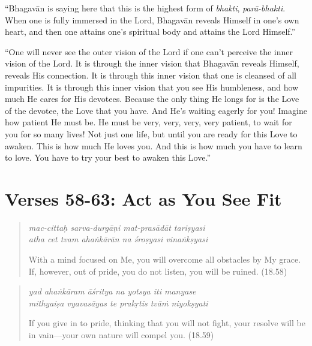 \documentclass[12pt, twoside, openright]{memoir}
\begin{document}
\enquote{Bhagavān is saying here that this is the highest form of \textit{bhakti}, \textit{parā-bhakti}. When one is fully immersed in the Lord, Bhagavān reveals Himself in one’s own heart, and then one attains one’s spiritual body and attains the Lord Himself.}

\enquote{One will never see the outer vision of the Lord if one can’t perceive the inner vision of the Lord. It is through the inner vision that Bhagavān reveals Himself, reveals His connection. It is through this inner vision that one is cleansed of all impurities. It is through this inner vision that you see His humbleness, and how much He cares for His devotees. Because the only thing He longs for is the Love of the devotee, the Love that you have. And He’s waiting eagerly for you! Imagine how patient He must be. He must be very, very, very, very patient, to wait for you for so many lives! Not just one life, but until you are ready for this Love to awaken. This is how much He loves you. And this is how much you have to learn to love. You have to try your best to awaken this Love.}

\section{Verses 58-63: Act as You See Fit}\label{sec-verses-58-63-act-as-you-see-fit}


\par
\begin{verse}
\textit{mac-cittaḥ sarva-durgāṇi mat-prasādāt tariṣyasi} \\
\textit{atha cet tvam ahaṅkārān na śroṣyasi vinaṅkṣyasi}

\noindent With a mind focused on Me, you will overcome all obstacles by My grace. If, however, out of pride, you do not listen, you will be ruined. (18.58)
\end{verse}
\par



\par
\begin{verse}
\textit{yad ahaṅkāram āśritya na yotsya iti manyase} \\
\textit{mithyaiṣa vyavasāyas te prakṛtis tvāṁ niyokṣyati}

\noindent If you give in to pride, thinking that you will not fight, your resolve will be in vain---your own nature will compel you. (18.59)
\end{verse}
\par
\end{document}
